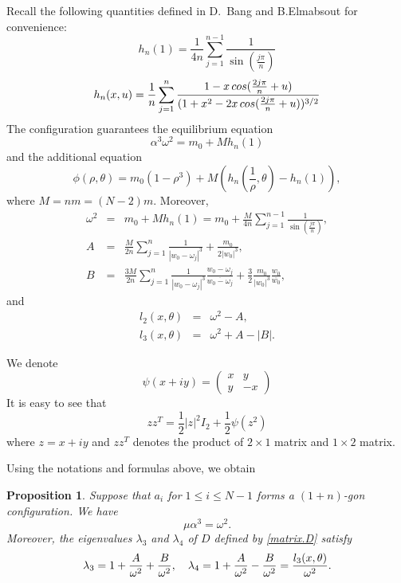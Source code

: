 \documentclass[11pt]{article}
\newtheorem{proposition}[lemma]{Proposition}
\def\th{{\theta}}
\def\om{{\omega}}
\def\lm{{\lambda}}
\def\ol#1{\overline{#1}}
\begin{document}
Recall the following quantities defined in D.~Bang and B.Elmabsout \cite{BaE} for convenience:
$$h_n(1)=\frac{1}{4n}\sum_{j=1}^{n-1}\frac{1}{\sin(\frac{j\pi}{n})}$$
$$h_n(x,u)=\frac{1}{n}\sum_{j=1}^{n}\frac{1-x\thinspace cos(\frac{2j\pi}{n}+u)}{(1+x^2-2x\thinspace cos(\frac{2j\pi}{n}+u))^{3/2}}$$
The configuration guarantees the equilibrium equation
$$\alpha^3\omega^2=m_0+Mh_n(1)$$
and the additional equation\cite{BaE}
$$\phi(\rho,\theta)=m_0(1-\rho^3)+M(h_n(\frac{1}{\rho},\theta)-h_n(1)),$$
where $M=nm=(N-2)m$.
Moreover,
 \begin{eqnarray}
 \omega^2&=&m_0+Mh_n(1)=m_0+\frac{M}{4n}\sum_{j=1}^{n-1}\frac{1}{\sin(\frac{j\pi}{n})},
 \\
 A&=&\frac{M}{2n}\sum_{j=1}^{n}\frac{1}{|w_0-\omega_j|^3}+\frac{m_0}{2|w_0|^3},
 \\
 B &=& \frac{3M}{2n}\sum_{j=1}^{n}\frac{1}{|w_0-\omega_j|^3}\frac{w_0-\om_j}{\ol{w_0-\om_j}}
 +\frac{3}{2}\frac{m_0}{|w_0|^3}\frac{w_0}{\ol{w_0}},
 \end{eqnarray}
 and
\begin{eqnarray}
l_2(x,\th)&=&\omega^2-A,
\\
l_3(x,\th)&=&\omega^2+A-|B|.
\end{eqnarray}
 
 \par 
 We denote 
 $$\psi(x+iy)=\left(\begin{array}{ll}
 x&y\\
 y&-x
 \end{array}
 \right)
 $$
 It is easy to see that 
 $$
 zz^{T}=\frac{1}{2}|z|^2I_{2}+\frac{1}{2}\psi(z^{2})
 $$
 where $z=x+iy$ and $zz^{T}$ denotes the product of $2\times 1$ matrix and $1\times 2$ matrix.
 
 Using the notations and formulas above, we obtain

 \begin{proposition}\label{polygon.prop.lm3.lm4}
	Suppose that $a_i$ for $1\leq i \leq N-1$ forms a $(1+n)$-gon configuration. We have
    $$\mu\alpha^3=\omega^2.$$
    Moreover, the eigenvalues $\lm_3$ and $\lm_4$ of $D$ defined by \eqref{matrix.D} satisfy
	\begin{align}
	\lm_3 = 1+{A\over\omega^2}+{B\over\omega^2},\quad
	\lm_4 = 1+{A\over\omega^2}-{B\over\omega^2}={l_3(x,\theta)\over\omega^2}.
	\end{align}
\end{proposition}
\end{document}
